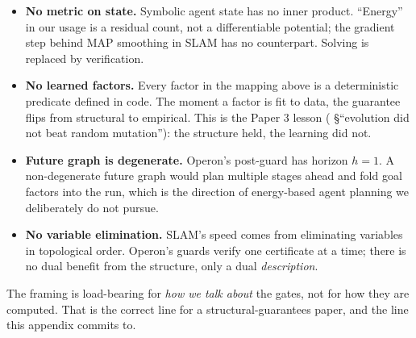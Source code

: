 \begin{itemize}[leftmargin=*,itemsep=2pt,topsep=2pt]
\item \textbf{No metric on state.}  Symbolic agent state has no
  inner product.  ``Energy'' in our usage is a residual count, not a
  differentiable potential; the gradient step behind MAP smoothing
  in SLAM has no counterpart.  Solving is replaced by verification.
\item \textbf{No learned factors.}  Every factor in the mapping
  above is a deterministic predicate defined in code.  The moment a
  factor is fit to data, the guarantee flips from structural to
  empirical.  This is the Paper 3 lesson (\cite{banu2026convergence}
  §``evolution did not beat random mutation''): the structure held,
  the learning did not.
\item \textbf{Future graph is degenerate.}  Operon's post-guard has
  horizon $h=1$.  A non-degenerate future graph would plan multiple
  stages ahead and fold goal factors into the run, which is the
  direction of energy-based agent planning we deliberately do not
  pursue.
\item \textbf{No variable elimination.}  SLAM's speed comes from
  eliminating variables in topological order.  Operon's guards
  verify one certificate at a time; there is no dual benefit from
  the structure, only a dual \emph{description}.
\end{itemize}

The framing is load-bearing for \emph{how we talk about} the gates,
not for how they are computed.  That is the correct line for a
structural-guarantees paper, and the line this appendix commits to.
